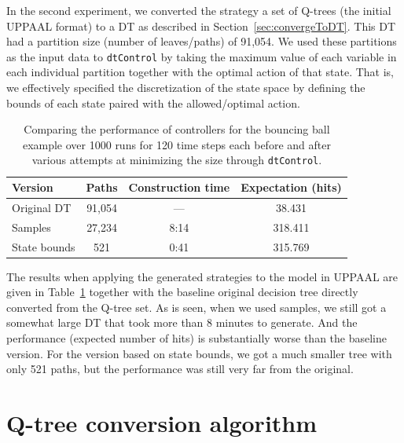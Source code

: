 \documentclass{article}
\begin{document}
In the second experiment, we converted the strategy a set of Q-trees (the
initial UPPAAL format) to a DT as described in Section~\ref{sec:convergeToDT}.
This DT had a partition size (number of leaves/paths) of 91,054. We used these
partitions as the input data to \texttt{dtControl} by taking the maximum value
of each variable in each individual partition together with the optimal action
of that state. That is, we effectively specified the discretization of the state
space by defining the bounds of each state paired with the allowed/optimal
action.

\begin{table}[ht]
    \centering
    \caption{%
        Comparing the performance of controllers for the bouncing ball example
        over 1000 runs for 120 time steps each before and after various attempts
        at minimizing the size through \texttt{dtControl}.  
    }\label{tab:dtcontrolTable}
    \begin{tabular}[t]{lccc}
        \toprule
        Version & Paths & Construction time & Expectation (hits) \\
        \midrule
        Original DT & 91,054 & --- & 38.431 \\
        Samples & 27,234 & 8:14 & 318.411 \\
        State bounds & 521 & 0:41 & 315.769 \\
        \bottomrule
    \end{tabular}
\end{table}


The results when applying the generated strategies to the model in UPPAAL are
given in Table~\ref{tab:dtcontrolTable} together with the baseline original
decision tree directly converted from the Q-tree set. As is seen, when we used
samples, we still got a somewhat large DT that took more than 8 minutes to
generate. And the performance (expected number of hits) is substantially worse
than the baseline version. For the version based on state bounds, we got a much
smaller tree with only 521 paths, but the performance was still very far from
the original.

\appendix

\section{Q-tree conversion algorithm}%
\label{app:qTreeConversion}
\end{document}
